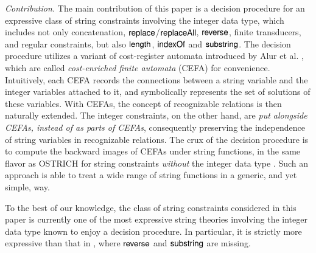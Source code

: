 \noindent\emph{Contribution.} The main contribution of this paper is a decision procedure for an expressive class of string constraints involving the integer data type, which includes not only concatenation, $\mathsf{replace}$/$\mathsf{replaceAll}$, $\mathsf{reverse}$, finite transducers, and regular constraints, but also $\mathsf{length}$, $\mathsf{indexOf}$ and $\mathsf{substring}$. The decision procedure utilizes a variant of cost-register automata introduced by Alur et al. \cite{RLJ+13}, which are called \emph{cost-enriched finite automata} (CEFA) for convenience. 
Intuitively, each CEFA records the connections between a string variable and the integer variables attached to it, and symbolically represents the set of solutions of these variables. With CEFAs, the concept of recognizable relations is then naturally extended. The integer constraints, on the other hand, are \emph{put alongside CEFAs, instead of as parts of CEFAs}, consequently preserving the independence of string variables in recognizable relations. 
The crux of the decision procedure is to compute the backward images of CEFAs under string functions, in the same flavor as OSTRICH for string constraints \emph{without} the integer data type \cite{CHL+19}. 
Such an approach %
is able to treat %
a wide range of string functions in a generic, and yet simple, way. 

To the best of our knowledge, the class of string constraints considered in this paper is currently one of the most expressive string theories involving the integer data type known to enjoy a decision procedure. In particular, it is strictly more expressive than that in \cite{LB16}, where $\mathsf{reverse}$ and $\mathsf{substring}$ are missing. 
%




